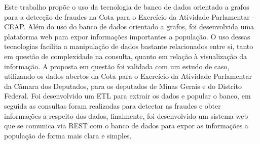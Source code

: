 	Este trabalho propõe o uso da tecnologia de banco de dados orientado a grafos para a detecção de fraudes na Cota para o Exercício da Atividade Parlamentar – CEAP. Além do uso do banco de dados orientado a grafos, foi desenvolvida uma plataforma web para expor informações importantes a população. O uso dessas tecnologias facilita a manipulação de dados bastante relacionados entre si, tanto em questão de complexidade na consulta, quanto em relação à visualização da informação. A proposta em questão foi validada com um estudo de caso, utilizando os dados abertos da Cota para o Exercício da Atividade Parlamentar da Câmara dos Deputados, para os deputados de Minas Gerais e do Distrito Federal. Foi desenvolvido um ETL para extrair os dados e popular o banco, em seguida as consultas foram realizadas para detectar as fraudes e obter informações a respeito dos dados, finalmente, foi desenvolvido um sistema web que se comunica via REST com o banco de dados para expor as informações a população de forma mais clara e simples.